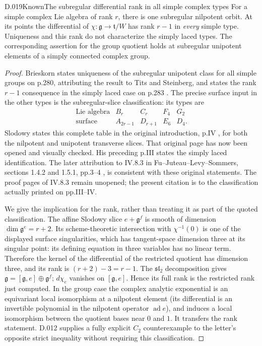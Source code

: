 \begin{saresult}{D.019}{Known}{The subregular differential rank in all simple complex types}
For a simple complex Lie algebra of rank $r$, there is one
subregular nilpotent orbit.  At its points the differential
of $\chi:\mathfrak g\to\mathfrak t/W$ has rank $r-1$ in
\emph{every} simple type.  Uniqueness and this rank do not
characterize the simply laced types.  The corresponding
assertion for the group quotient holds at subregular
unipotent elements of a simply connected complex group.
\end{saresult}
\begin{proof}
Brieskorn states uniqueness of the subregular unipotent class
for all simple groups on p.280, attributing the result to
Tits and Steinberg, and states the rank $r-1$ consequence in
the simply laced case on p.283 \cite{D-Brieskorn}.
The precise surface input in the other types is the
subregular-slice classification: its types are
\[
\begin{array}{c|cccc}
\text{Lie algebra}&B_r&C_r&F_4&G_2\\ \hline
\text{surface}&A_{2r-1}&D_{r+1}&E_6&D_4.
\end{array}
\]
Slodowy states this complete table in the original introduction,
p.IV \cite{D-Slodowy}, for both the nilpotent and unipotent
transverse slices.  That original page has now been opened and
visually checked.  His preceding p.III states the simply laced
identification.  The later attribution to IV.8.3 in
Fu--Juteau--Levy--Sommers, sections 1.4.2 and 1.5.1,
pp.3--4 \cite{D-FJLS}, is consistent with these original statements.
The proof pages of IV.8.3 remain unopened; the present citation
is to the classification actually printed on pp.III--IV.

We give the implication for the rank, rather than treating
it as part of the quoted classification.  The affine
Slodowy slice $e+\mathfrak g^f$ is smooth of dimension
$\dim\mathfrak g^e=r+2$.  Its scheme-theoretic intersection
with $\chi^{-1}(0)$ is one of the displayed surface
singularities, which has tangent-space dimension three at
its singular point: its defining equation in three
variables has no linear term.  Therefore the kernel of
the differential of the restricted quotient has dimension
three, and its rank is $(r+2)-3=r-1$.
The $\mathfrak{sl}_2$ decomposition gives
$\mathfrak g=[\mathfrak g,e]\oplus\mathfrak g^f$;
$d\chi_e$ vanishes on $[\mathfrak g,e]$.  Hence its full
rank is the restricted rank just computed.  In the group
case the complex analytic exponential is an equivariant
local isomorphism at a nilpotent element (its differential
is an invertible polynomial in the nilpotent operator
$\operatorname{ad}e$), and induces a local isomorphism
between the quotient bases near $0$ and $1$.  It transfers
the rank statement.  D.012 supplies a fully explicit
$C_2$ counterexample to the letter's opposite strict
inequality without requiring this classification.
\end{proof}

